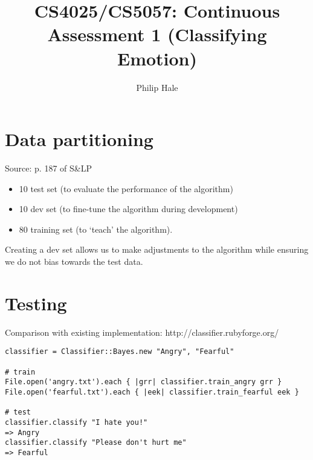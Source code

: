 \documentclass[a4paper,oneside]{article}
\author{Philip Hale}
\title{CS4025/CS5057: Continuous Assessment 1 (Classifying Emotion)}
\begin{document}
\maketitle

\section{Data partitioning}
Source: p. 187 of S\&LP

\begin{itemize}
  \item 10 test set (to evaluate the performance of the algorithm)
  \item 10 dev set (to fine-tune the algorithm during development)
  \item 80 training set (to `teach' the algorithm).
\end{itemize}

Creating a dev set allows us to make adjustments to the algorithm while
ensuring we do not bias towards the test data.

\section{Testing}

Comparison with existing implementation: http://classifier.rubyforge.org/

\begin{listing}[H]
\begin{verbatim}
classifier = Classifier::Bayes.new "Angry", "Fearful"

# train
File.open('angry.txt').each { |grr| classifier.train_angry grr }
File.open('fearful.txt').each { |eek| classifier.train_fearful eek }

# test
classifier.classify "I hate you!"
=> Angry
classifier.classify "Please don't hurt me"
=> Fearful
\end{verbatim}
\end{listing}
\end{document}
